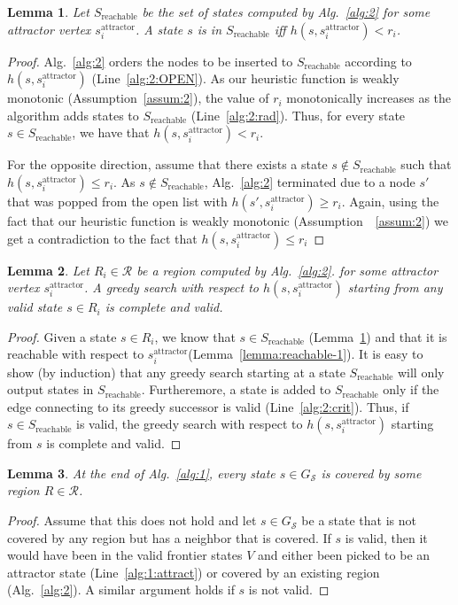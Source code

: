 \documentclass[letterpaper]{article} %
\newcommand{\calS}{\ensuremath{\mathcal{S}}\xspace}
\newcommand{\calR}{\ensuremath{\mathcal{R}}\xspace}
\newcommand{\sAttract}{\ensuremath{s^{\text{attractor}}_i}\xspace}
\newtheorem{lemma}{Lemma}
\begin{document}
\begin{lemma}
\label{lemma:reachable-2}
Let $S_{\text{reachable}}$ be the set of states computed by Alg.~\ref{alg:2} for some attractor vertex \sAttract.
%
A state $s$ is in $S_{\text{reachable}}$ iff $h(s, \sAttract) < r_i$.
\end{lemma}

\begin{proof}
Alg.~\ref{alg:2} orders the nodes to be inserted to $S_{\text{reachable}}$ according to $h(s, \sAttract)$ (Line~\ref{alg:2:OPEN}).
As our heuristic function is weakly monotonic (Assumption~\ref{assum:2}), the value of $r_i$ monotonically increases as the algorithm adds states to $S_{\text{reachable}}$ (Line~\ref{alg:2:rad}).
Thus, for every state $s \in S_{\text{reachable}}$, we have that $h(s, \sAttract) < r_i$.

For the opposite direction, assume that there exists a state $s \notin S_{\text{reachable}}$ such that $h(s, \sAttract) \leq r_i$.
As $s\notin S_{\text{reachable}}$, Alg.~\ref{alg:2} terminated due to a node $s'$ that was popped from the open list with 
$h(s', \sAttract) \geq r_i$.
Again, using the fact that our heuristic function is weakly monotonic (Assumption~~\ref{assum:2}) we get a contradiction to the fact that $h(s, \sAttract) \leq r_i$
\end{proof}

\begin{lemma}
\label{lemma:greedy}
Let $R_i \in \calR$ be a region computed by Alg.~\ref{alg:2}.
for some attractor vertex \sAttract.
% 
A greedy search with respect to $h(s, \sAttract)$  starting from any valid state $s \in R_i$ is complete and valid.
\end{lemma}

\begin{proof}
Given a state $s \in R_i$, we know that $s \in S_{\text{reachable}}$ (Lemma~\ref{lemma:reachable-2})
and that it is reachable with respect to \sAttract (Lemma~\ref{lemma:reachable-1}).
%
It is easy to show (by induction) that any greedy search starting at a state $S_{\text{reachable}}$ will only output states in $S_{\text{reachable}}$.
Furtheremore, a state is added to $S_{\text{reachable}}$ only if the edge connecting to its greedy successor is valid (Line~\ref{alg:2:crit}).
Thus, if $s\in S_{\text{reachable}}$ is valid, the greedy search with respect to $h(s, \sAttract)$  starting from $s$ is complete and valid.
\end{proof}

\begin{lemma}
\label{lemma:coverage}
At the end of Alg.~\ref{alg:1}, every state $s \in G_\calS$ is covered by some region $R \in \calR$.
\end{lemma}
\begin{proof}
Assume that this does not hold and let $s \in G_\calS$ be a state that is not covered by any region but has a neighbor that is covered.
%
If $s$ is valid, then it would have been in the valid frontier states $V$ and either been picked to be an attractor state (Line~\ref{alg:1:attract}) or covered by an existing region (Alg.~\ref{alg:2}).
%
A similar argument holds if $s$ is not valid.
\end{proof}
\end{document}
